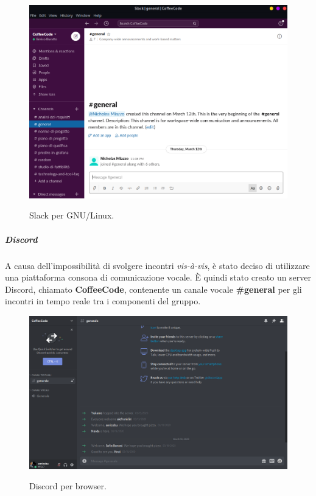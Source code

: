 \documentclass[../norme-di-progetto.tex]{subfiles}
\begin{document}
\begin{figure}[H]
  \centering
  \includegraphics[width=15cm]{img/slack.png}
  \label{fig:slack}
  \caption{Slack per GNU/Linux.}
\end{figure}

\subparagraph*{Discord}
A causa dell'impossibilità di svolgere incontri \textit{vis-à-vis}, è stato deciso di utilizzare una piattaforma consona di comunicazione vocale. È quindi stato creato un server Discord, chiamato \textbf{CoffeeCode}, contenente un canale vocale \textbf{\#general} per gli incontri in tempo reale tra i componenti del gruppo.

\begin{figure}[H]
  \centering
  \includegraphics[width=15cm]{img/discord.png}
  \label{fig:discord}
  \caption{Discord per browser.}
\end{figure}
\end{document}
